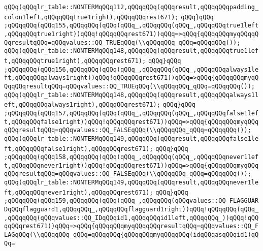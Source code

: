 \verb|qQQq(qQQqlr_table::NONTERMqQQq112,qQQqqQQq(qQQqresult,qQQqqQQqpadding_colon1left,qQQqqQQqtrue1right),qQQqqQQqrest671);|\newline
\verb|qQQq}qQQq|\newline
\verb|;qQQqqQQq(qQQq155,qQQqqQQq(qQQq(qQQq_,qQQqqQQq(qQQq_,qQQqqQQqtrue1left,qQQqqQQqtrue1right))qQQq!qQQqqQQqrest671))qQQq=>qQQq{qQQqqQQqmyqQQqqQQqresultqQQq=qQQqvalues::QQ_TRUEqQQq(\\qQQqqQQq_qQQq=qQQqqQQq());|\newline
\verb|qQQq(qQQqlr_table::NONTERMqQQq148,qQQqqQQq(qQQqresult,qQQqqQQqtrue1left,qQQqqQQqtrue1right),qQQqqQQqrest671);|\newline
\verb|qQQq}qQQq|\newline
\verb|;qQQqqQQq(qQQq156,qQQqqQQq(qQQq(qQQq_,qQQqqQQq(qQQq_,qQQqqQQqalways1left,qQQqqQQqalways1right))qQQq!qQQqqQQqrest671))qQQq=>qQQq{qQQqqQQqmyqQQqqQQqresultqQQq=qQQqvalues::QQ_TRUEqQQq(\\qQQqqQQq_qQQq=qQQqqQQq());|\newline
\verb|qQQq(qQQqlr_table::NONTERMqQQq148,qQQqqQQq(qQQqresult,qQQqqQQqalways1left,qQQqqQQqalways1right),qQQqqQQqrest671);|\newline
\verb|qQQq}qQQq|\newline
\verb|;qQQqqQQq(qQQq157,qQQqqQQq(qQQq(qQQq_,qQQqqQQq(qQQq_,qQQqqQQqfalse1left,qQQqqQQqfalse1right))qQQq!qQQqqQQqrest671))qQQq=>qQQq{qQQqqQQqmyqQQqqQQqresultqQQq=qQQqvalues::QQ_FALSEqQQq(\\qQQqqQQq_qQQq=qQQqqQQq());|\newline
\verb|qQQq(qQQqlr_table::NONTERMqQQq149,qQQqqQQq(qQQqresult,qQQqqQQqfalse1left,qQQqqQQqfalse1right),qQQqqQQqrest671);|\newline
\verb|qQQq}qQQq|\newline
\verb|;qQQqqQQq(qQQq158,qQQqqQQq(qQQq(qQQq_,qQQqqQQq(qQQq_,qQQqqQQqnever1left,qQQqqQQqnever1right))qQQq!qQQqqQQqrest671))qQQq=>qQQq{qQQqqQQqmyqQQqqQQqresultqQQq=qQQqvalues::QQ_FALSEqQQq(\\qQQqqQQq_qQQq=qQQqqQQq());|\newline
\verb|qQQq(qQQqlr_table::NONTERMqQQq149,qQQqqQQq(qQQqresult,qQQqqQQqnever1left,qQQqqQQqnever1right),qQQqqQQqrest671);|\newline
\verb|qQQq}qQQq|\newline
\verb|;qQQqqQQq(qQQq159,qQQqqQQq(qQQq(qQQq_,qQQqqQQq(qQQqvalues::QQ_FLAGGUARDqQQqflagguard1,qQQqqQQq_,qQQqqQQqflagguard1right))qQQq!qQQqqQQq(qQQq_,qQQqqQQq(qQQqvalues::QQ_IDqQQqid1,qQQqqQQqid1left,qQQqqQQq_))qQQq!qQQqqQQqrest671))qQQq=>qQQq{qQQqqQQqmyqQQqqQQqresultqQQq=qQQqvalues::QQ_FLAGqQQq(\\qQQqqQQq_qQQq=qQQqqQQq{qQQqqQQqmyqQQqqQQq(idqQQqasqQQqid1)qQQq=|\newline
